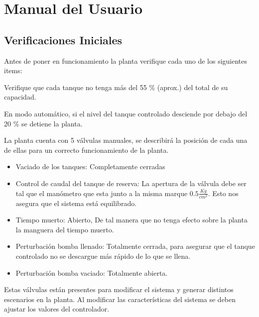 \chapter{Manual del Usuario}
\label{anexo:manualUsuario}


\section{Verificaciones Iniciales}
\label{anexo:verificaciones}
Antes de poner en funcionamiento la planta verifique cada uno de los siguientes 
items:

\begin{tcolorbox}[title=Nivel de agua]
Verifique que cada tanque no tenga más del 55 \% (aprox.) del total de su 
capacidad. 
\end {tcolorbox}
\begin{lattention}
En modo automático, si el nivel del tanque controlado desciende por debajo del 
20 \% se detiene la planta. 
\end{lattention}



\begin{tcolorbox}[title=Válvulas manuales, breakable]
La planta cuenta con 5 válvulas manuales, se describirá la posición de cada una 
de ellas para un correcto funcionamiento de la planta. 
 
 \begin{itemize}
  \item Vaciado de los tanques: Completamente cerradas
  \item Control de caudal del tanque de reserva:
  La apertura de la válvula debe ser tal que el manómetro que esta junto
  a la misma marque $0.5\frac{Kg}{cm^2}$. Esto nos asegura que el sistema está 
  equilibrado.
  \item Tiempo muerto: Abierto, De tal manera que no tenga efecto sobre la 
  planta la manguera del tiempo muerto.
  \item Perturbación bomba llenado: Totalmente cerrada, para asegurar que el 
  tanque controlado no se descargue más rápido de lo que se llena.
  \item Perturbación bomba vaciado: Totalmente abierta.
 \end{itemize}
 \tcblower
 Estas válvulas están presentes para modificar el sistema y generar distintos 
escenarios en la planta. Al modificar las características del sistema se deben 
ajustar los valores del controlador.
\end {tcolorbox}


